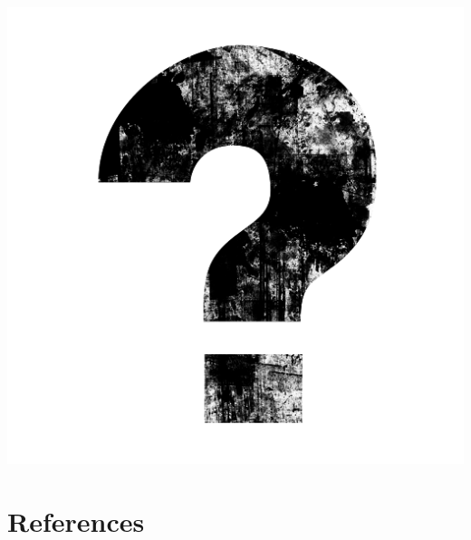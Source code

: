 \documentclass[10pt,xcolor={dvipsnames}]{beamer}
\begin{document}
	\begin{frame}
		\centering
		\includegraphics[scale=0.3]{fig/questions.png}
	\end{frame}
	
	\section[References]{References}
	
	
	
	
\end{document}
